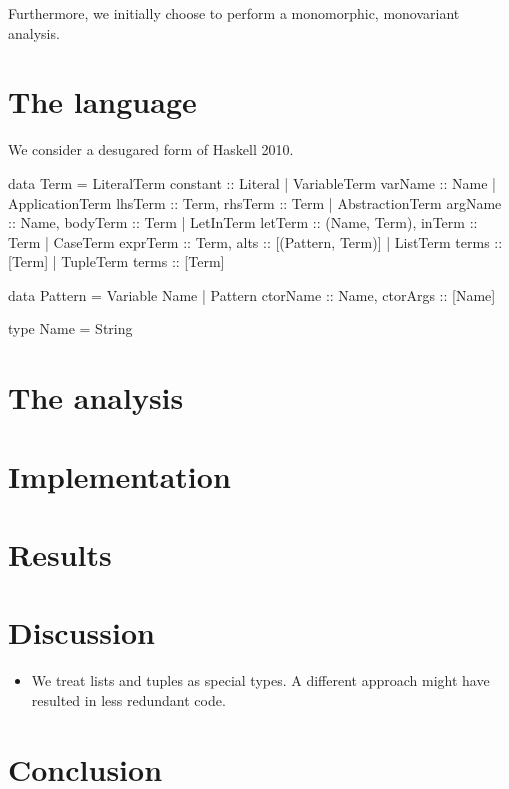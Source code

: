 \documentclass[a4paper]{scrartcl}
\begin{document}
Furthermore, we initially choose to perform a monomorphic, monovariant analysis.

\section{The language}
We consider a desugared form of Haskell 2010.

\begin{code}
data Term = LiteralTerm     {constant :: Literal}
          | VariableTerm    {varName :: Name}
          | ApplicationTerm {lhsTerm :: Term, rhsTerm :: Term}
          | AbstractionTerm {argName :: Name, bodyTerm :: Term}
          | LetInTerm       {letTerm :: (Name, Term), inTerm :: Term}
          | CaseTerm        {exprTerm :: Term, alts :: [(Pattern, Term)]}          
          | ListTerm        {terms :: [Term]}
          | TupleTerm       {terms :: [Term]}

data Pattern = Variable Name
             | Pattern {ctorName :: Name, ctorArgs :: [Name]}

type Name = String
\end{code}


\section{The analysis}


\section{Implementation}
\section{Results}
\section{Discussion}
\begin{itemize}
\item
    We treat lists and tuples as special types. A different approach might
    have resulted in less redundant code.
\end{itemize}

\section{Conclusion}
\end{document}
